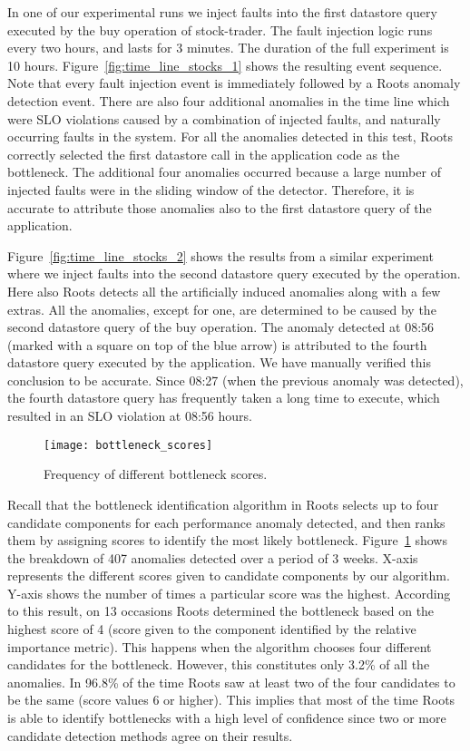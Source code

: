 In one of our experimental runs we inject faults into the first datastore query executed by the buy operation
of stock-trader. The fault injection logic runs every two hours, and lasts for 3 minutes. The duration of
the full experiment is 10 hours. 
Figure~\ref{fig:time_line_stocks_1} shows the resulting event sequence. Note that every fault injection
event is immediately followed by a Roots anomaly detection event. There are also four additional
anomalies in the time line which were SLO violations caused by a combination of injected faults, and
naturally occurring faults in the system. For all the anomalies detected
in this test, Roots correctly selected the first datastore call in the application code as the bottleneck. 
The additional four anomalies occurred because a large number of injected faults were in the sliding window
of the detector. Therefore, it is accurate to attribute those anomalies also to the first datastore query
of the application.

Figure~\ref{fig:time_line_stocks_2} shows the results from a similar experiment where we inject
faults into the second datastore query executed by the operation. Here also Roots detects all the
artificially induced anomalies along with a few extras. All the anomalies, except for one, 
are determined to be caused by the second
datastore query of the buy operation. The anomaly detected at 08:56 (marked with a square on top of the blue arrow) 
is attributed to the fourth datastore query executed by the application. We have manually verified this
conclusion to be accurate. Since 08:27 (when the previous anomaly was detected), the fourth datastore
query has frequently taken a long time to execute, which resulted in an SLO violation at 08:56 hours.

\begin{figure}
\centering
\texttt{[image: bottleneck\_scores]}
\caption{Frequency of different bottleneck scores.}
\label{fig:bottleneck_scores}
\end{figure}

Recall that the bottleneck identification algorithm in Roots
selects up to four candidate components for each performance anomaly detected, and then ranks them
by assigning scores to identify the most likely bottleneck. Figure~\ref{fig:bottleneck_scores} shows the breakdown of 407 anomalies
detected over a period of 3 weeks. X-axis represents the different scores given to candidate components
by our algorithm. Y-axis shows the number of times a particular score was the highest. 
According to this result, on 13 occasions Roots determined the bottleneck based on the highest score
of 4 (score given to the component identified by the relative importance metric). 
This happens when the algorithm chooses four different candidates
for the bottleneck. However, this constitutes only 3.2\% of all the anomalies. In 96.8\% of the time Roots saw
at least two of the four candidates to be the same (score values 6 or higher). This implies that most of the time Roots is able to
identify bottlenecks with a high level of confidence since two or more candidate detection methods
agree on their results.

